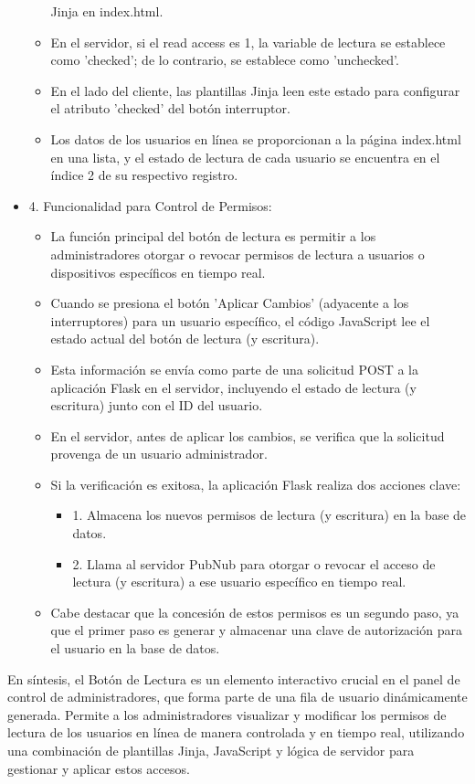 \documentclass{report}
\begin{document}
\begin{itemize}
\begin{itemize}
            Jinja en index.html.
            \item En el servidor, si el read access es 1, la variable de lectura se establece como 'checked'; de lo contrario, se establece como 
            'unchecked'.
            \item En el lado del cliente, las plantillas Jinja leen este estado para configurar el atributo 'checked' del botón interruptor.
            \item Los datos de los usuarios en línea se proporcionan a la página index.html en una lista, y el estado de lectura de cada usuario 
            se encuentra en el índice 2 de su respectivo registro.        
        \end{itemize}
    \item 4. Funcionalidad para Control de Permisos:
        \begin{itemize}
            \item La función principal del botón de lectura es permitir a los administradores otorgar o revocar permisos de lectura a usuarios 
            o dispositivos específicos en tiempo real.
            \item Cuando se presiona el botón 'Aplicar Cambios' (adyacente a los interruptores) para un usuario específico, el código JavaScript 
            lee el estado actual del botón de lectura (y escritura).
            \item Esta información se envía como parte de una solicitud POST a la aplicación Flask en el servidor, incluyendo el estado de 
            lectura (y escritura) junto con el ID del usuario.
            \item En el servidor, antes de aplicar los cambios, se verifica que la solicitud provenga de un usuario administrador.
            \item Si la verificación es exitosa, la aplicación Flask realiza dos acciones clave:
                \begin{itemize}
                    \item 1. Almacena los nuevos permisos de lectura (y escritura) en la base de datos.
                    \item 2. Llama al servidor PubNub para otorgar o revocar el acceso de lectura (y escritura) a ese usuario específico en 
                    tiempo real.                
                \end{itemize}
            \item Cabe destacar que la concesión de estos permisos es un segundo paso, ya que el primer paso es generar y almacenar una 
            clave de autorización para el usuario en la base de datos.        
        \end{itemize}
\end{itemize}
En síntesis, el Botón de Lectura es un elemento interactivo crucial en el panel de control de administradores, que forma parte de una fila 
de usuario dinámicamente generada. Permite a los administradores visualizar y modificar los permisos de lectura de los usuarios en línea de 
manera controlada y en tiempo real, utilizando una combinación de plantillas Jinja, JavaScript y lógica de servidor para 
gestionar y aplicar estos accesos.
\end{document}
